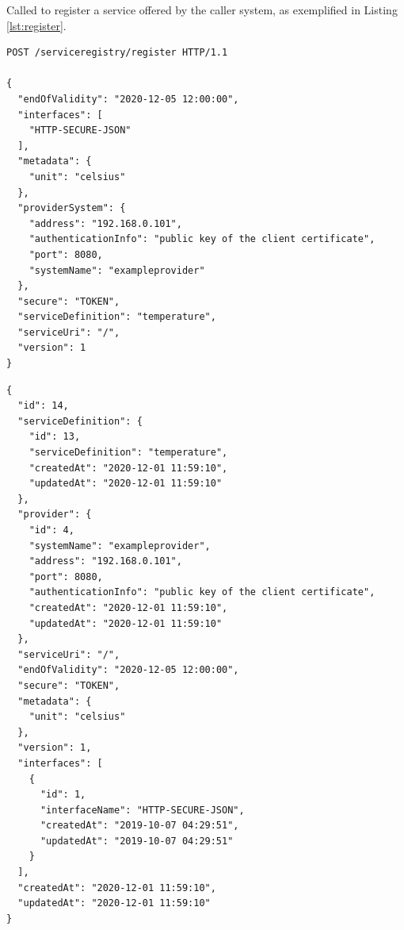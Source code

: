 \documentclass[a4paper]{arrowhead}
\newcommand{\fref}[1]{{\textcolor{ArrowheadBlue}{\hyperref[sec:functions:#1]{#1}}}}
\newcommand{\pref}[1]{{\textcolor{ArrowheadGrey}{\hyperref[sec:model:primitives:#1]{#1}}}}
\begin{document}
Called to register a service offered by the caller system, as exemplified in Listing \ref{lst:register}.

\begin{lstlisting}[language=http,label={lst:register},caption={A \fref{Register} invocation.}]
POST /serviceregistry/register HTTP/1.1

{
  "endOfValidity": "2020-12-05 12:00:00",
  "interfaces": [
    "HTTP-SECURE-JSON"
  ],
  "metadata": {
    "unit": "celsius"
  },
  "providerSystem": {
    "address": "192.168.0.101",
    "authenticationInfo": "public key of the client certificate",
    "port": 8080,
    "systemName": "exampleprovider"
  },
  "secure": "TOKEN",
  "serviceDefinition": "temperature",
  "serviceUri": "/",
  "version": 1
}
\end{lstlisting}

\begin{lstlisting}[language=http,label={lst:register_response},caption={A \fref{Register} response. Every \pref{Object} contains an id.}]
{
  "id": 14,
  "serviceDefinition": {
    "id": 13,
    "serviceDefinition": "temperature",
    "createdAt": "2020-12-01 11:59:10",
    "updatedAt": "2020-12-01 11:59:10"
  },
  "provider": {
    "id": 4,
    "systemName": "exampleprovider",
    "address": "192.168.0.101",
    "port": 8080,
    "authenticationInfo": "public key of the client certificate",
    "createdAt": "2020-12-01 11:59:10",
    "updatedAt": "2020-12-01 11:59:10"
  },
  "serviceUri": "/",
  "endOfValidity": "2020-12-05 12:00:00",
  "secure": "TOKEN",
  "metadata": {
    "unit": "celsius"
  },
  "version": 1,
  "interfaces": [
    {
      "id": 1,
      "interfaceName": "HTTP-SECURE-JSON",
      "createdAt": "2019-10-07 04:29:51",
      "updatedAt": "2019-10-07 04:29:51"
    }
  ],
  "createdAt": "2020-12-01 11:59:10",
  "updatedAt": "2020-12-01 11:59:10"
}
\end{lstlisting}

\end{document}
